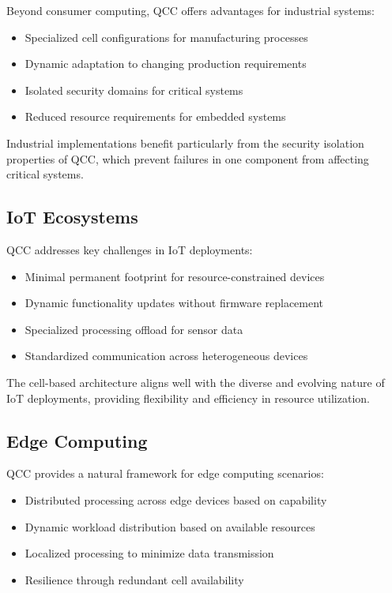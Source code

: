 \documentclass[11pt,a4paper]{article}
\begin{document}
Beyond consumer computing, QCC offers advantages for industrial systems:

\begin{itemize}
    \item Specialized cell configurations for manufacturing processes
    \item Dynamic adaptation to changing production requirements
    \item Isolated security domains for critical systems
    \item Reduced resource requirements for embedded systems
\end{itemize}

Industrial implementations benefit particularly from the security isolation properties of QCC, which prevent failures in one component from affecting critical systems.

\subsection{IoT Ecosystems}

QCC addresses key challenges in IoT deployments:

\begin{itemize}
    \item Minimal permanent footprint for resource-constrained devices
    \item Dynamic functionality updates without firmware replacement
    \item Specialized processing offload for sensor data
    \item Standardized communication across heterogeneous devices
\end{itemize}

The cell-based architecture aligns well with the diverse and evolving nature of IoT deployments, providing flexibility and efficiency in resource utilization.

\subsection{Edge Computing}

QCC provides a natural framework for edge computing scenarios:

\begin{itemize}
    \item Distributed processing across edge devices based on capability
    \item Dynamic workload distribution based on available resources
    \item Localized processing to minimize data transmission
    \item Resilience through redundant cell availability
\end{itemize}
\end{document}
